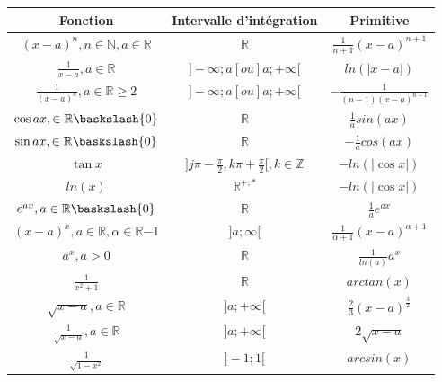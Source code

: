 \documentclass{article}
\begin{document}
\begin{center}
    \section*{}
    \begin{tabular}{|c|c|c|}
    \hline
    Fonction& Intervalle d'intégration & Primitive \\
    \hline
    $(x-a)^n , n\in \mathbb{N}, a\in \mathbb{R}$ & $ \mathbb{R}$ & $\frac{1}{n+1}(x-a)^{n+1}$ \\
    \hline
    $\frac{1}{x-a}, a\in \mathbb{R}$& $] -\infty;a[ou]a;+\infty [$& $ln(|x-a|)$\\
    \hline
    $ \frac{1}{(x-a)^n}, a \in \mathbb{R} \geqslant 2 $ & $] -\infty;a[ou]a;+\infty [$ & $-\frac{1}{(n-1)(x-a)^{n-1}}$\\
    \hline
    $\cos{ax}, \in \mathbb{R}\baskslash {0}$ & $\mathbb{R}$ & $\frac{1}{a} sin(ax)$ \\
    \hline
    $\sin{ax}, \in \mathbb{R}\baskslash {0}$ & $\mathbb{R}$ & $-\frac{1}{a} cos(ax)$ \\
    \hline
    $\tan{x}$ & $] j\pi -\frac{\pi}{2}, k\pi + \frac{\pi}{2} [, k\in \mathbb{Z}$ & $-ln(|\cos{x}|)$ \\
    \hline
    $ln(x)$ & $\mathbb{R}^{+,*}$ & $ -ln(|\cos{x}|) $ \\
    \hline
    $e^{ax}, a\in \mathbb{R} \baskslash {0}$ & $\mathbb{R}$ & $\frac{1}{a}e^{ax}$ \\
    \hline
    $(x-a)^x, a\in \mathbb{R}, \alpha\in \mathbb{R} {-1}$ & $] a;\infty [$ & $ \frac{1}{\alpha+1}(x-a)^{\alpha+1} $\\
    \hline
    $a^x,a>0$ & $\mathbb{R}$ & $\frac{1}{ln(a)}a^x$ \\
    \hline
    $ \frac{1}{x^2+1} $ & $ \mathbb{R} $ & $ arctan(x)$ \\
    \hline
    $ \sqrt{x-a}, a \in \mathbb{R} $ & $ ] a;+\infty [ $ & $ \frac{2}{3}(x-a)^{\frac{3}{2}} $ \\
    \hline
    $\frac{1}{\sqrt{x-a}}, a \in \mathbb{R}$ & $] a;+\infty [$ & $2\sqrt{x-a}$\\
    \hline
    $\frac{1}{\sqrt{1-x^2}}$ & $] -1;1 [$ & $arcsin(x)$ \\
    \hline
    \end{tabular}
\end{center}
\end{document}
